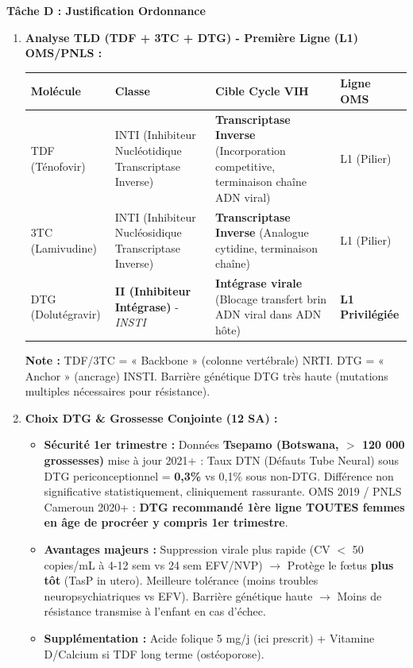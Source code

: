 \documentclass[11pt]{article}
\begin{document}
\begin{exoresolu}
\noindent\textbf{Tâche D : Justification Ordonnance}
\begin{enumerate}
    \item \textbf{Analyse TLD (TDF + 3TC + DTG) - Première Ligne (L1) OMS/PNLS :}
    \begin{center}
    \begin{tabular}{|l|l|l|l|}\hline
    \textbf{Molécule} & \textbf{Classe} & \textbf{Cible Cycle VIH} & \textbf{Ligne OMS} \\ \hline
    TDF (Ténofovir) & INTI (Inhibiteur Nucléotidique Transcriptase Inverse) & \textbf{Transcriptase Inverse} (Incorporation competitive, terminaison chaîne ADN viral) & L1 (Pilier) \\ \hline
    3TC (Lamivudine) & INTI (Inhibiteur Nucléosidique Transcriptase Inverse) & \textbf{Transcriptase Inverse} (Analogue cytidine, terminaison chaîne) & L1 (Pilier) \\ \hline
    DTG (Dolutégravir) & \textbf{II (Inhibiteur Intégrase)} - \emph{INSTI} & \textbf{Intégrase virale} (Blocage transfert brin ADN viral dans ADN hôte) & \textbf{L1 Privilégiée} \\ \hline
    \end{tabular}
    \end{center}
    \textbf{Note :} TDF/3TC = « Backbone » (colonne vertébrale) NRTI. DTG = « Anchor » (ancrage) INSTI. Barrière génétique DTG très haute (mutations multiples nécessaires pour résistance).
    \item \textbf{Choix DTG \& Grossesse Conjointe (12 SA) :}
    \begin{itemize}
        \item \textbf{Sécurité 1er trimestre :} Données \textbf{Tsepamo (Botswana, $>$ 120 000 grossesses)} mise à jour 2021+ : Taux DTN (Défauts Tube Neural) sous DTG periconceptionnel = \textbf{0,3\%} vs 0,1\% sous non-DTG. Différence non significative statistiquement, cliniquement rassurante. OMS 2019 / PNLS Cameroun 2020+ : \textbf{DTG recommandé 1ère ligne TOUTES femmes en âge de procréer y compris 1er trimestre}.
        \item \textbf{Avantages majeurs :} Suppression virale plus rapide (CV $<$ 50 copies/mL à 4-12 sem vs 24 sem EFV/NVP) $\rightarrow$ Protège le fœtus \textbf{plus tôt} (TasP in utero). Meilleure tolérance (moins troubles neuropsychiatriques vs EFV). Barrière génétique haute $\rightarrow$ Moins de résistance transmise à l'enfant en cas d'échec.
        \item \textbf{Supplémentation :} Acide folique 5 mg/j (ici prescrit) + Vitamine D/Calcium si TDF long terme (ostéoporose).

\end{itemize}
\end{enumerate}
\end{exoresolu}
\end{document}

